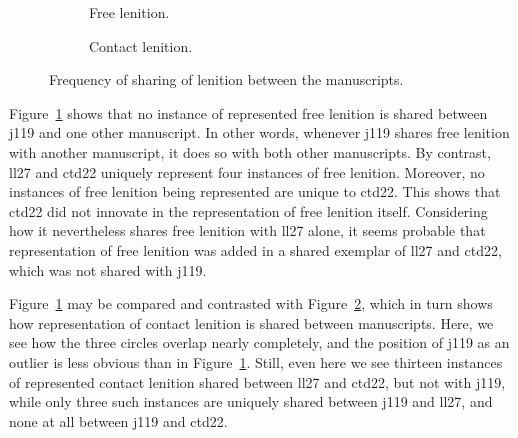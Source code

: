 \begin{figure}[h]
  \begin{subfigure}[b]{0.5\linewidth}
    \centering
    
    \caption{Free lenition.}
    \label{fig:vennfreelendewi}
  \end{subfigure}%
  \begin{subfigure}[b]{0.5\linewidth}
    \centering
    
    \caption{Contact lenition.}
    \label{fig:venncontlendewi}
  \end{subfigure}
  \caption{Frequency of sharing of lenition between  the manuscripts.}
  \label{fig:vennlendewi}
\end{figure}
Figure~\ref{fig:vennfreelendewi} shows that no instance of represented free lenition  is shared between \gls{j119} and one other manuscript. In other words, whenever \gls{j119} shares free lenition with another manuscript, it does so with both other manuscripts. By contrast, \gls{ll27} and \gls{ctd22} uniquely represent four instances of free lenition. Moreover, no instances of free lenition being represented are unique to \gls{ctd22}. This shows that \gls{ctd22} did not innovate in the representation of free lenition itself. Considering how it nevertheless shares free lenition with \gls{ll27} alone, it seems probable that representation of free lenition was added in a shared exemplar of \gls{ll27} and \gls{ctd22}, which was not shared with \gls{j119}.


Figure~\ref{fig:vennfreelendewi} may be compared and contrasted with Figure~\ref{fig:venncontlendewi}, which in turn shows how representation of contact lenition is shared between manuscripts. Here, we see how the three circles overlap nearly completely, and the position of \gls{j119} as an outlier is less obvious than in Figure~\ref{fig:vennfreelendewi}. Still, even here we see thirteen instances of represented contact lenition shared between \gls{ll27} and \gls{ctd22}, but not with \gls{j119}, while only three such instances are uniquely  shared between \gls{j119} and \gls{ll27}, and none at all between \gls{j119} and \gls{ctd22}.

